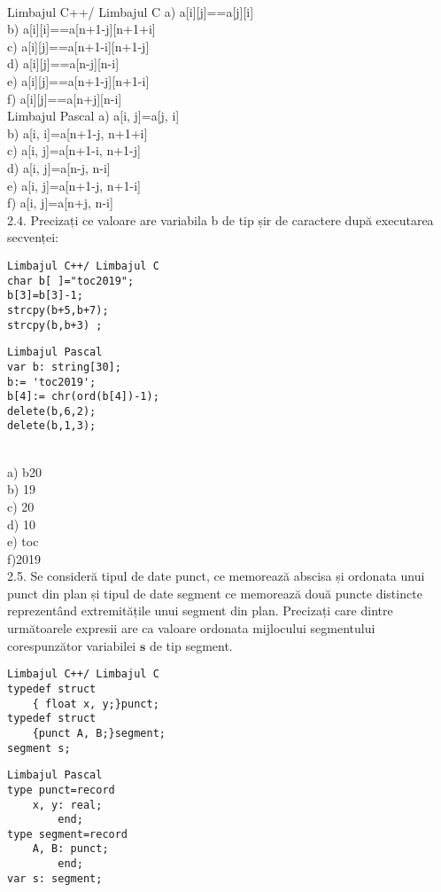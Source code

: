 \\
Limbajul C++/ Limbajul C
a) a[i][j]==a[j][i]
\\
b) a[i][i]==a[n+1-j][n+1+i]
\\
c) a[i][j]==a[n+1-i][n+1-j]
\\
d) a[i][j]==a[n-j][n-i]
\\
e) a[i][j]==a[n+1-j][n+1-i]
\\
f) a[i][j]==a[n+j][n-i]
\\
Limbajul Pascal
a) a[i, j]=a[j, i]
\\
b) a[i, i]=a[n+1-j, n+1+i]
\\
c) a[i, j]=a[n+1-i, n+1-j]
\\
d) a[i, j]=a[n-j, n-i]
\\
e) a[i, j]=a[n+1-j, n+1-i]
\\
f) a[i, j]=a[n+j, n-i]
\\
2.4. Precizați ce valoare are variabila b de tip șir de caractere după executarea secvenței:
\begin{verbatim}
Limbajul C++/ Limbajul C
char b[ ]="toc2019";
b[3]=b[3]-1;
strcpy(b+5,b+7);
strcpy(b,b+3) ;
\end{verbatim}
\begin{verbatim}
Limbajul Pascal
var b: string[30];
b:= 'toc2019';
b[4]:= chr(ord(b[4])-1);
delete(b,6,2);
delete(b,1,3);
\end{verbatim}
\\
a) b20
\\
b) 19
\\
c) 20
\\
d) 10
\\
e) toc
\\
f)2019
\\
2.5. Se consideră tipul de date punct, ce memorează abscisa și ordonata unui punct din plan și tipul de date segment ce memorează două puncte distincte reprezentând extremitățile unui segment din plan. Precizați care dintre următoarele expresii are ca valoare ordonata mijlocului segmentului corespunzător variabilei $\mathbf{s}$ de tip segment.
\begin{verbatim}
Limbajul C++/ Limbajul C
typedef struct
    { float x, y;}punct;
typedef struct
    {punct A, B;}segment;
segment s;
\end{verbatim}
\begin{verbatim}
Limbajul Pascal
type punct=record
    x, y: real;
        end;
type segment=record
    A, B: punct;
        end;
var s: segment;
\end{verbatim}
\\
